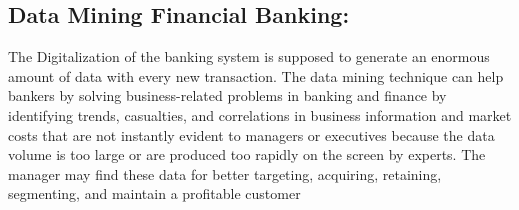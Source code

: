 \documentclass[a4paper,10pt]{article}
\begin{document}
\subsection{Data Mining Financial Banking:}

The Digitalization of the banking system is supposed to generate an enormous amount of data with every new transaction. The data mining technique can help bankers by solving business-related problems in banking and finance by identifying trends, casualties, and correlations in business information and market costs that are not instantly evident to managers or executives because the data volume is too large or are produced too rapidly on the screen by experts. The manager may find these data for better targeting, acquiring, retaining, segmenting, and maintain a profitable customer
\end{document}
